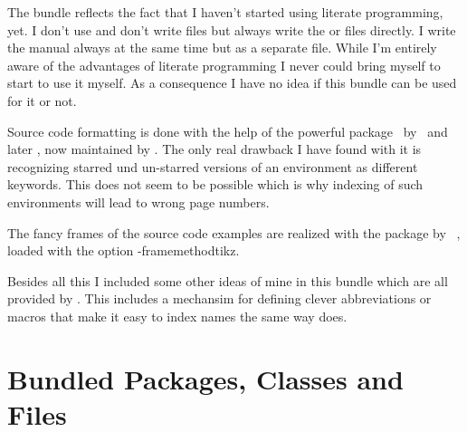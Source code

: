 \documentclass[load-preamble+,babel-options={ngerman,english}]{cnltx-doc}
\newcommand*\file[1]{\code{#1}}
\begin{document}
The bundle reflects the fact that I haven't started using literate
programming, yet.  I don't use  and don't write \file{dtx}
files but always write the \file{sty} or  files directly.  I write
the manual always at the same time but as a separate file.  While I'm entirely
aware of the advantages of literate programming I never could bring myself to
start to use it myself.  As a consequence I have no idea if this bundle can be
used for it or not.

Source code formatting is done with the help of the powerful
 package~\cite{pkg:listings} by \heinz\ and later \moses, now
maintained by \hoffmann.  The only real drawback I have found with it is
recognizing starred und un-starred versions of an environment as different
keywords.  This does not seem to be possible which is why indexing of such
environments will lead to wrong page numbers.

The fancy frames of the source code examples are realized with the
 package by \daniel~\cite{pkg:mdframed}, loaded with the option
\keyis*-{framemethod}{tikz}.

Besides all this I included some other ideas of mine in this bundle which are
all provided by \cnltxtools.  This includes a mechansim for defining clever
abbreviations or macros that make it easy to index names the same way
 does.


\section{Bundled Packages, Classes and Files}
\end{document}
